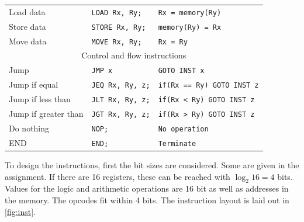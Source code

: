 \documentclass[a4paper, english]{article}
\numberwithin{equation}{section}
\begin{document}
\begin{table}[H]
\begin{tabular}{lll}
        Load data                & \texttt{LOAD Rx, Ry;}    & \texttt{Rx = memory(Ry)}          \\
        Store data               & \texttt{STORE Rx, Ry;}   & \texttt{memory(Ry) = Rx}          \\
        Move data                & \texttt{MOVE Rx, Ry;}    & \texttt{Rx = Ry}                  \\
        \midrule
        \multicolumn{3}{c}{Control and flow instructions}                                       \\
        \midrule
        Jump                     & \texttt{JMP x}           & \texttt{GOTO INST x}              \\
        Jump if equal            & \texttt{JEQ Rx, Ry, z;}  & \texttt{if(Rx == Ry) GOTO INST z} \\
        Jump if less than        & \texttt{JLT Rx, Ry, z;}  & \texttt{if(Rx < Ry) GOTO INST z}  \\
        Jump if greater than     & \texttt{JGT Rx, Ry, z;}  & \texttt{if(Rx > Ry) GOTO INST z}  \\
        Do nothing               & \texttt{NOP;}            & \texttt{No operation}             \\
        END                      & \texttt{END;}            & \texttt{Terminate}                \\
        \bottomrule
    \end{tabular}
\end{table}
To design the instructions, first the bit sizes are considered. Some are given in the assignment. If there are 16 registers, these can be reached with \(\log_2{16} = 4\) bits. Values for the logic and arithmetic operations are 16 bit as well as addresses in the memory. The opcodes fit within 4 bits.\newline
The instruction layout is laid out in \cref{fig:inst}.
\end{document}
